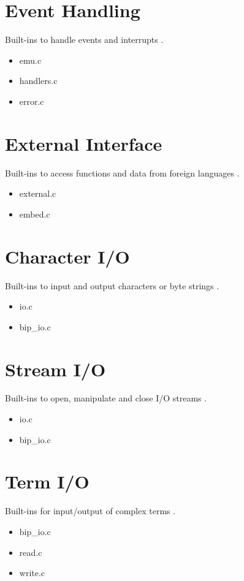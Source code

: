 \section{Event Handling }
     Built-ins to handle events and interrupts .
     \begin{itemize}
     \item emu.c
     \item handlers.c
     \item error.c
     \end{itemize}

\section{External Interface }
     Built-ins to access functions and data from foreign languages .
     \begin{itemize}
     \item external.c
     \item embed.c
     \end{itemize}

\section{Character I/O }
     Built-ins to input and output characters or byte strings .
     \begin{itemize}
     \item io.c
     \item bip_io.c
     \end{itemize}

\section{Stream I/O }
     Built-ins to open, manipulate and close I/O streams .
     \begin{itemize}
     \item io.c
     \item bip_io.c
     \end{itemize}

\section{Term I/O }
     Built-ins for input/output of complex terms .
     \begin{itemize}
     \item bip_io.c
     \item read.c
     \item write.c
     \end{itemize}


